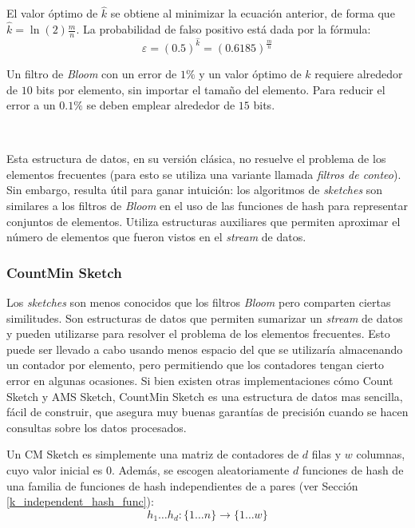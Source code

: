 \documentclass[a4paper,10pt, oneside]{article}
\begin{document}
El valor óptimo de $\hat{k}$ se obtiene al minimizar la ecuación anterior, de forma que $\hat{k} = \ln(2) \frac{m}{n}$. La probabilidad de falso positivo está dada por la fórmula\cite{Bloom:1970:STH:362686.362692}:
\begin{equation}
	\varepsilon = (0.5) ^ {\hat{k}} = (0.6185)^{\frac{m}{n}}
\end{equation}

Un filtro de \textit{Bloom} con un error de $1\%$ y un valor óptimo de $k$ requiere alrededor de $10$ bits por elemento, sin importar el tamaño del elemento. Para reducir el error a un $0.1\%$ se deben emplear alrededor de $15$ bits.

\

Esta estructura de datos, en su versión clásica, no resuelve el problema de los elementos frecuentes (para esto se utiliza una variante llamada \textit{filtros de conteo}). Sin embargo, resulta útil para ganar intuición: los algoritmos de \textit{sketches} son similares a los filtros de \textit{Bloom} en el uso de las funciones de hash para representar conjuntos de elementos. Utiliza estructuras auxiliares que permiten aproximar el número de elementos que fueron vistos en el \textit{stream} de datos.  

\subsubsection{CountMin Sketch}

Los \textit{sketches} son menos conocidos que los filtros \textit{Bloom} pero comparten ciertas similitudes. Son estructuras de datos que permiten sumarizar un \textit{stream} de datos y pueden utilizarse para resolver el problema de los elementos frecuentes. Esto puede ser llevado a cabo usando menos espacio del que se utilizaría almacenando un contador por elemento, pero permitiendo que los contadores tengan cierto error en algunas ocasiones. Si bien existen otras implementaciones cómo Count Sketch\cite{Charikar:2002:FFI:646255.684566} y AMS Sketch\cite{Alon:1996:SCA:237814.237823}, CountMin Sketch es una estructura de datos mas sencilla, fácil de construir, que asegura muy buenas garantías de precisión cuando se hacen consultas sobre los datos procesados.

Un CM Sketch es simplemente una matriz de contadores de $d$ filas y $w$ columnas, cuyo valor inicial es $0$. Además, se escogen aleatoriamente $d$ funciones de hash de una familia de funciones de hash independientes de a pares (ver Sección \ref{k_independent_hash_func}):
\begin{equation*}
	h_1 \dots h_d: \{1 \dots n\} \rightarrow \{1 \dots w\}
\end{equation*}
\end{document}

